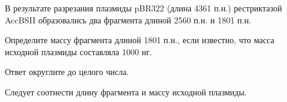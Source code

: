 
В результате разрезания плазмиды pBR322 (длина 4361 п.н.) рестриктазой AccBSII образовались два фрагмента длиной  2560 п.н. и 1801 п.н.

Определите массу фрагмента длиной 1801 п.н., если известно, что масса исходной плазмиды составляла 1000 нг.

Ответ округлите до целого числа. 

\explanationSection

Следует соотнести длину фрагмента и массу исходной плазмиды.

